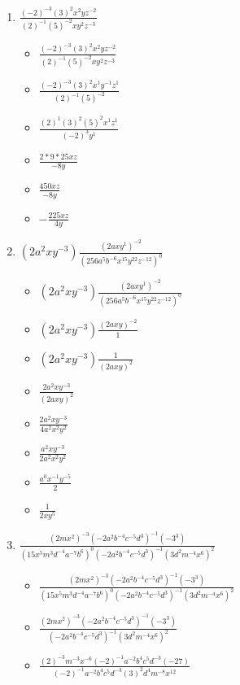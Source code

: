 \documentclass{article}
\begin{document}
\begin{enumerate}
\item {\Large $\frac{(-2)^{-3}(3)^{2}x^{2}yz^{-2}}{(2)^{-1}(5)^{-2}xy^{2}z^{-3}}$}
  \begin{itemize}
  \item {\Large $\frac{(-2)^{-3}(3)^{2}x^{2}yz^{-2}}{(2)^{-1}(5)^{-2}xy^{2}z^{-3}}$}
  \item {\Large $\frac{(-2)^{-3}(3)^{2}x^{1}y^{-1}z^{1}}{(2)^{-1}(5)^{-2}}$}
  \item {\Large $\frac{(2)^{1}(3)^{2}(5)^{2}x^{1}z^{1}}{(-2)^{3}y^{1}}$}
  \item {\Large $\frac{2*9*25xz}{-8y}$}
  \item {\Large $\frac{450xz}{-8y}$}
  \item {\Large $-\frac{225xz}{4y}$}
  \end{itemize}
\item {\Large $(2a^{2}xy^{-3})\frac{(2axy^{1})^{-2}}{(256a^{5}b^{-6}x^{15}y^{22}z^{-12})^{0}}$}
  \begin{itemize}
  \item {\Large $(2a^{2}xy^{-3})\frac{(2axy^{1})^{-2}}{(256a^{5}b^{-6}x^{15}y^{22}z^{-12})^{0}}$}
  \item {\Large $(2a^{2}xy^{-3})\frac{(2axy)^{-2}}{1}$}
  \item {\Large $(2a^{2}xy^{-3})\frac{1}{(2axy)^{2}}$}
  \item {\Large $\frac{2a^{2}xy^{-3}}{(2axy)^{2}}$}
  \item {\Large $\frac{2a^{2}xy^{-3}}{4a^{2}x^{2}y^{2}}$}
  \item {\Large $\frac{a^{2}xy^{-3}}{2a^{2}x^{2}y^{2}}$}
  \item {\Large $\frac{a^{0}x^{-1}y^{-5}}{2}$}
  \item {\Large $\frac{1}{2xy^{5}}$}
  \end{itemize}
\item {\Large $\frac{(2mx^{2})^{-3}(-2a^{2}b^{-4}c^{-5}d^{3})^{-1}(-3^{3})}{(15x^{5}m^{3}d^{-4}a^{-7}b^{6})^{0}(-2a^{2}b^{-4}c^{-5}d^{3})^{-1}(3d^{2}m^{-4}x^{6})^{2}}$}
  \begin{itemize}
  \item {\Large $\frac{(2mx^{2})^{-3}(-2a^{2}b^{-4}c^{-5}d^{3})^{-1}(-3^{3})}{(15x^{5}m^{3}d^{-4}a^{-7}b^{6})^{0}(-2a^{2}b^{-4}c^{-5}d^{3})^{-1}(3d^{2}m^{-4}x^{6})^{2}}$}
  \item {\Large $\frac{(2mx^{2})^{-3}(-2a^{2}b^{-4}c^{-5}d^{3})^{-1}(-3^{3})}{(-2a^{2}b^{-4}c^{-5}d^{3})^{-1}(3d^{2}m^{-4}x^{6})^{2}}$}
  \item {\Large $\frac{(2)^{-3}m^{-3}x^{-6}(-2)^{-1}a^{-2}b^{4}c^{5}d^{-3}(-27)}{(-2)^{-1}a^{-2}b^{4}c^{5}d^{-3}(3)^{2}d^{4}m^{-8}x^{12}}$}

\end{itemize}
\end{enumerate}
\end{document}
